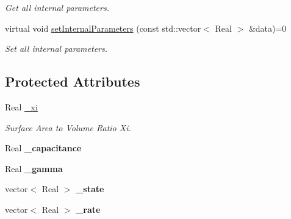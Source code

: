 \begin{DoxyCompactItemize}
\begin{DoxyCompactList}\small\item\em Get all internal parameters. \item\end{DoxyCompactList}\item 
\hypertarget{classvoom_1_1_ionic_material_a33436ae3d6125810d5dbe04d72c461aa}{
virtual void \hyperlink{classvoom_1_1_ionic_material_a33436ae3d6125810d5dbe04d72c461aa}{setInternalParameters} (const std::vector$<$ Real $>$ \&data)=0}
\label{classvoom_1_1_ionic_material_a33436ae3d6125810d5dbe04d72c461aa}

\begin{DoxyCompactList}\small\item\em Set all internal parameters. \item\end{DoxyCompactList}\end{DoxyCompactItemize}
\subsection*{Protected Attributes}
\begin{DoxyCompactItemize}
\item 
\hypertarget{classvoom_1_1_ionic_material_a0830fb431f7e236f8d0e89c164cc60c8}{
Real \hyperlink{classvoom_1_1_ionic_material_a0830fb431f7e236f8d0e89c164cc60c8}{\_\-xi}}
\label{classvoom_1_1_ionic_material_a0830fb431f7e236f8d0e89c164cc60c8}

\begin{DoxyCompactList}\small\item\em Surface Area to Volume Ratio Xi. \item\end{DoxyCompactList}\item 
\hypertarget{classvoom_1_1_ionic_material_aa0e0bbfb07eeeb2dad7facb9fde4f9b3}{
Real {\bfseries \_\-capacitance}}
\label{classvoom_1_1_ionic_material_aa0e0bbfb07eeeb2dad7facb9fde4f9b3}

\item 
\hypertarget{classvoom_1_1_ionic_material_a438cb63a97064f3d66b7ad048c4c0df5}{
Real {\bfseries \_\-gamma}}
\label{classvoom_1_1_ionic_material_a438cb63a97064f3d66b7ad048c4c0df5}

\item 
\hypertarget{classvoom_1_1_ionic_material_a420c671931fa0bed1c86e3b421cae18d}{
vector$<$ Real $>$ {\bfseries \_\-state}}
\label{classvoom_1_1_ionic_material_a420c671931fa0bed1c86e3b421cae18d}

\item 
\hypertarget{classvoom_1_1_ionic_material_a1f5fa0aff73b45a750d76eed63193d45}{
vector$<$ Real $>$ {\bfseries \_\-rate}}
\label{classvoom_1_1_ionic_material_a1f5fa0aff73b45a750d76eed63193d45}

\end{DoxyCompactItemize}


